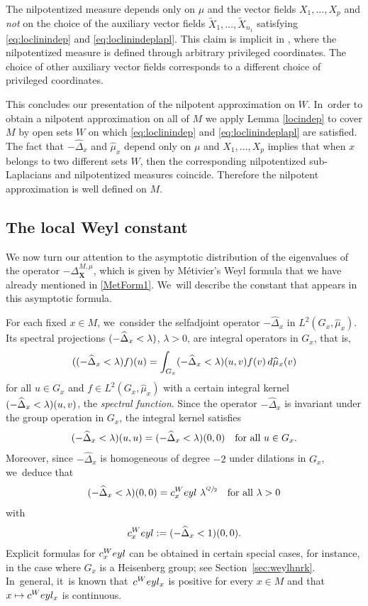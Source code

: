 \documentclass[11pt]{article}
\newcommand\mto{\mathchoice{\longmapsto}{\mapsto}{\mapsto}{\mapsto}}
\let\oldsfrac\sfrac
\renewcommand{\sfrac}[2]{{\oldsfrac{#1}{#2}}}
\newcommand{\Weyl}{\textup{Weyl}}
\newcommand{\bX}{{\boldsymbol{X}}}
\theoremstyle{definition}
\let\Xb\bX
\newcommand{\1}{\mathbbm{1}}
\numberwithin{equation}{section}
\begin{document}
The nilpotentized measure depends only on $\mu$ and the vector fields $X_1,\ldots, X_p$ and \emph{not} on the choice of the auxiliary vector fields $\tilde X_1,\ldots,\tilde X_{n_1}$ satisfying \eqref{eq:loclinindep} and \eqref{eq:loclinindeplapl}. This claim is implicit in \cite[\S A.5.6]{CHT1}, where the nilpotentized measure is defined through arbitrary privileged coordinates. The choice of other auxiliary vector fields corresponds to a different choice of privileged coordinates.

This concludes our presentation of the nilpotent approximation on $W$. In~order to obtain a nilpotent approximation on all of $M$ we apply Lemma \ref{locindep} to cover $M$ by open sets $W$ on which \eqref{eq:loclinindep} and \eqref{eq:loclinindeplapl} are satisfied. The fact that $-\widehat\Delta_x$ and $\widehat\mu_x$ depend only on $\mu$ and $X_1,\ldots,X_p$ implies that when $x$ belongs to two different sets $W$, then the corresponding nilpotentized sub-Laplacians and nilpotentized measures coincide. Therefore the nilpotent approximation is well defined on $M$.

\subsection{The local Weyl constant}
We now turn our attention to the asymptotic distribution of the eigenvalues of the operator $-\Delta_{\Xb}^{M,\mu}$, which is given by Métivier's Weyl formula \cite{Me} that we have already mentioned in \eqref{MetForm1}. We~will describe the constant that appears in this asymptotic formula.

For each fixed $x\in M$, we~consider the selfadjoint operator $-\widehat \Delta_x$ in $L^2(G_x,\widehat\mu_x)$. Its spectral projections $\1(-\widehat\Delta_x<\lambda)$, $\lambda>0$, are integral operators in $G_x$, that is,
\[
(\1(-\widehat\Delta_x<\lambda) f)(u) = \int_{G_x} \1(-\widehat\Delta_x<\lambda)(u,v) f(v)\,d\widehat\mu_x(v)
\]
for all $u\in G_x$ and $f\in L^2(G_x,\widehat\mu_x)$ with a certain integral kernel $\1(-\widehat\Delta_x<\lambda)(u,v)$, the \emph{spectral function}. Since the operator $-\widehat\Delta_x$ is invariant under the group operation in $G_x$, the integral kernel satisfies
\[
\1(-\widehat\Delta_x<\lambda)(u,u) = \1(-\widehat\Delta_x<\lambda)(0,0)
\quad\text{for all}\ u\in G_x.
\]
Moreover, since $-\widehat\Delta_x$ is homogeneous of degree $-2$ under dilations in $G_x$, we~deduce that
\begin{equation}
\label{eq:specfcndiag1}
\1(-\widehat\Delta_x<\lambda)(0,0) = c_x^\Weyl \ \lambda^{\sfrac Q2}
\quad\text{for all}\ \lambda>0
\end{equation}
with
\begin{equation}
\label{eq:specfcndiag2}
c_x^\Weyl := \1(-\widehat\Delta_x<1)(0,0).
\end{equation}
Explicit formulas for $c_x^\Weyl$ can be obtained in certain special cases, for instance, in the case where $G_x$ is a Heisenberg group; see Section~\ref{sec:weylhnrk}. In~general, it~is known that~$c^\Weyl_x$ is positive for every $x\in M$ and that $x\mto c^\Weyl_x$ is continuous.
\end{document}
